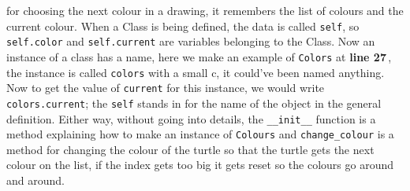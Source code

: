 \documentclass[11pt,a4paper]{scrartcl}
\newcommand{\lnn}[1]{\textbf{line #1}\,}
\begin{document}
for choosing the next colour in a drawing, it remembers the list of
colours and the current colour. When a Class is being defined, the
data is called \texttt{self}, so \texttt{self.color} and
\texttt{self.current} are variables belonging to the Class. Now an
instance of a class has a name, here we make an example of
\texttt{Colors} at \lnn{27}, the instance is called \texttt{colors}
with a small c, it could've been named anything. Now to get the value
of \texttt{current} for this instance, we would write
\texttt{colors.current}; the \texttt{self} stands in for the name of
the object in the general definition. Either way, without going into
details, the \texttt{\_\_init\_\_} function is a method explaining how
to make an instance of \texttt{Colours} and \texttt{change\_colour} is
a method for changing the colour of the turtle so that the turtle gets
the next colour on the list, if the index gets too big it gets reset
so the colours go around and around.
\end{document}
